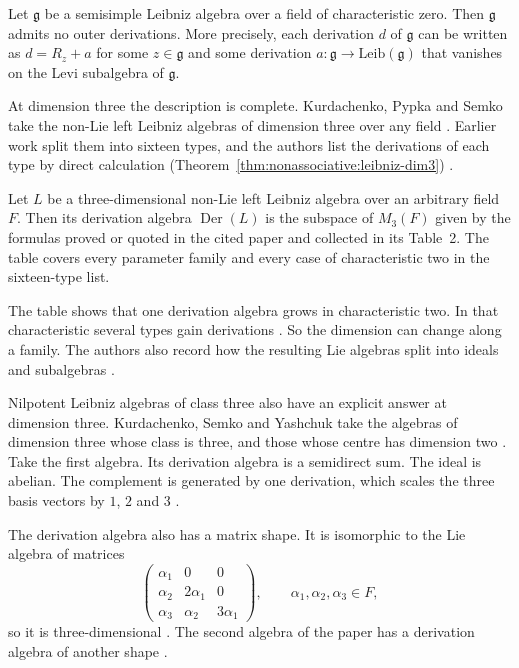 \begin{proposition}
\label{prop:nonassociative:leibniz-no-outer}
Let $\mathfrak{g}$ be a semisimple Leibniz algebra over a field of
characteristic zero. Then $\mathfrak{g}$ admits no outer derivations.
More precisely, each derivation $d$ of $\mathfrak{g}$ can be written as
$d=R_z+a$ for some $z\in\mathfrak{g}$ and some derivation
$a\colon\mathfrak{g}\to \mathrm{Leib}(\mathfrak{g})$ that vanishes on
the Levi subalgebra of $\mathfrak{g}$.
\end{proposition}

At dimension three the description is complete. Kurdachenko, Pypka and Semko
take the non-Lie left Leibniz algebras of dimension three over any field
\cite[p.~1]{KurdachenkoPypkaSemko2026}. Earlier work split them into sixteen
types, and the authors list the derivations of each type by direct calculation (Theorem~\ref{thm:nonassociative:leibniz-dim3})
\cite[p.~1]{KurdachenkoPypkaSemko2026}.\begin{theorem}\label{thm:nonassociative:leibniz-dim3}
Let $L$ be a three-dimensional non-Lie left Leibniz algebra over an
arbitrary field $F$. Then its derivation algebra $\operatorname{Der}(L)$ is
the subspace of $M_{3}(F)$ given by the formulas proved or quoted in the
cited paper and collected in its Table~2. The table covers every parameter
family and every case of characteristic two in the sixteen-type list.
\end{theorem}

The table shows that one derivation algebra grows in characteristic two. In
that characteristic several types gain derivations
\cite[p.~1]{KurdachenkoPypkaSemko2026}. So the dimension can change along a
family. The authors also record how the resulting Lie algebras split into
ideals and subalgebras \cite[p.~1]{KurdachenkoPypkaSemko2026}.

Nilpotent Leibniz algebras of class three also have an explicit answer at
dimension three. Kurdachenko, Semko and Yashchuk take the algebras of dimension
three whose class is three, and those whose centre has dimension two
\cite[p.~819]{KurdachenkoSemkoYashchuk2024}. Take the first algebra. Its
derivation algebra is a semidirect sum. The ideal is abelian. The complement is
generated by one derivation, which scales the three basis vectors by $1$, $2$
and $3$ \cite[Theorem~3.1, pp.~821--822]{KurdachenkoSemkoYashchuk2024}.

The derivation algebra also has a matrix shape. It is isomorphic to the Lie
algebra of matrices
\[
\begin{pmatrix}\alpha_1&0&0\\ \alpha_2&2\alpha_1&0\\ \alpha_3&\alpha_2&3\alpha_1\end{pmatrix},
\qquad \alpha_1,\alpha_2,\alpha_3\in F,
\]
so it is three-dimensional
\cite[Theorem~3.1, pp.~821--822]{KurdachenkoSemkoYashchuk2024}. The second algebra
of the paper has a derivation algebra of another shape
\cite[Theorem~3.2, p.~825]{KurdachenkoSemkoYashchuk2024}.

